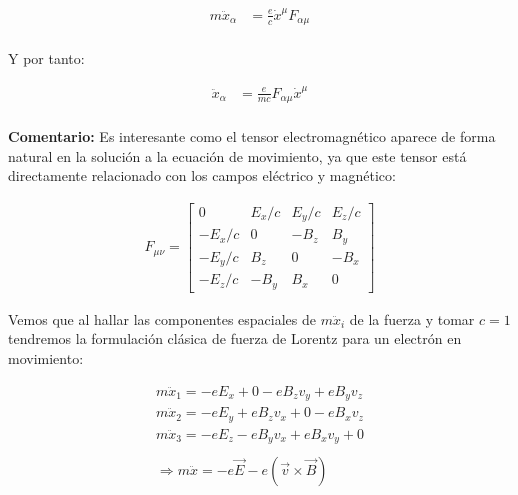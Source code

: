 \begin{align*}
    m\ddot{x}_\alpha &= \frac{e}{c}\dot{x}^\mu F_{\alpha\mu}\\
\end{align*}

Y por tanto:

\begin{align*}
    \ddot{x}_\alpha &= \frac{e}{mc}F_{\alpha\mu}\dot{x}^\mu \\
\end{align*}

\textbf{Comentario:}
Es interesante como el tensor electromagnético aparece de forma natural en la solución a la ecuación de movimiento, ya que este tensor está directamente relacionado con los campos eléctrico y magnético:

\begin{align*}
    F_{\mu \nu }={\begin{bmatrix}0&E_{x}/c&E_{y}/c&E_{z}/c\\-E_{x}/c&0&-B_{z}&B_{y}\\-E_{y}/c&B_{z}&0&-B_{x}\\-E_{z}/c&-B_{y}&B_{x}&0\end{bmatrix}}
\end{align*}

Vemos que al hallar las componentes espaciales de $m\ddot{x}_i$ de la fuerza y tomar $c=1$ tendremos la formulación clásica de fuerza de Lorentz para un electrón en movimiento:

\begin{align*}
    m\ddot{x}_1 = - eE_x+0-eB_zv_y+eB_yv_z\\
    m\ddot{x}_2 = - eE_y+eB_zv_x+0-eB_xv_z\\
    m\ddot{x}_3 = - eE_z-eB_yv_x+eB_xv_y+0\\\\
    \Rightarrow
    m\ddot{x} = -e\vec{E}-e\left(\vec{v}\times\vec{B}\right)
\end{align*}

